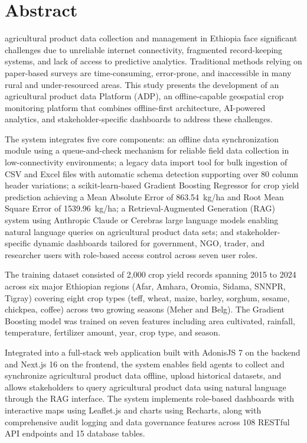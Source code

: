 \documentclass[12pt,a4paper,oneside]{report}
\begin{document}
\chapter*{Abstract}
agricultural product data collection and management in Ethiopia face significant challenges due to unreliable internet connectivity, fragmented record-keeping systems, and lack of access to predictive analytics. Traditional methods relying on paper-based surveys are time-consuming, error-prone, and inaccessible in many rural and under-resourced areas. This study presents the development of an agricultural product data Platform (ADP), an offline-capable geospatial crop monitoring platform that combines offline-first architecture, AI-powered analytics, and stakeholder-specific dashboards to address these challenges.

The system integrates five core components: an offline data synchronization module using a queue-and-check mechanism for reliable field data collection in low-connectivity environments; a legacy data import tool for bulk ingestion of CSV and Excel files with automatic schema detection supporting over 80 column header variations; a scikit-learn-based Gradient Boosting Regressor for crop yield prediction achieving a Mean Absolute Error of 863.54~kg/ha and Root Mean Square Error of 1539.96~kg/ha; a Retrieval-Augmented Generation (RAG) system using Anthropic Claude or Cerebras large language models enabling natural language queries on agricultural product data sets; and stakeholder-specific dynamic dashboards tailored for government, NGO, trader, and researcher users with role-based access control across seven user roles.

The training dataset consisted of 2,000 crop yield records spanning 2015 to 2024 across six major Ethiopian regions (Afar, Amhara, Oromia, Sidama, SNNPR, Tigray) covering eight crop types (teff, wheat, maize, barley, sorghum, sesame, chickpea, coffee) across two growing seasons (Meher and Belg). The Gradient Boosting model was trained on seven features including area cultivated, rainfall, temperature, fertilizer amount, year, crop type, and season.

Integrated into a full-stack web application built with AdonisJS 7 on the backend and Next.js 16 on the frontend, the system enables field agents to collect and synchronize agricultural product data offline, upload historical datasets, and allows stakeholders to query agricultural product data using natural language through the RAG interface. The system implements role-based dashboards with interactive maps using Leaflet.js and charts using Recharts, along with comprehensive audit logging and data governance features across 108 RESTful API endpoints and 15 database tables.
\end{document}
